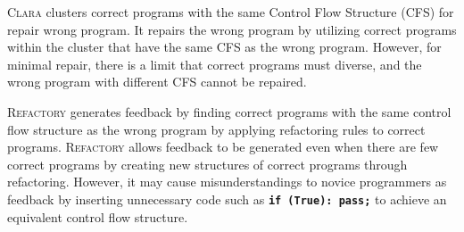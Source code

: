 \documentclass[10pt,conference]{IEEEtran}
\begin{document}
        \textsc{Clara} \cite{gulwani2018automated} clusters correct programs with the same Control Flow Structure (CFS) for repair wrong program. It repairs the wrong program by utilizing correct programs within the cluster that have the same CFS as the wrong program. However, for minimal repair, there is a limit that correct programs must diverse, and the wrong program with different CFS cannot be repaired.
        
        
        \textsc{Refactory} \cite{hu2019re} generates feedback by finding correct programs with the same control flow structure as the wrong program by applying refactoring rules to correct programs. \textsc{Refactory} allows feedback to be generated even when there are few correct programs by creating new structures of correct programs through refactoring. However, it may cause misunderstandings to novice programmers as feedback by inserting unnecessary code such as \textbf{\texttt{if (True): pass;}} to achieve an equivalent control flow structure.
        
\end{document}
